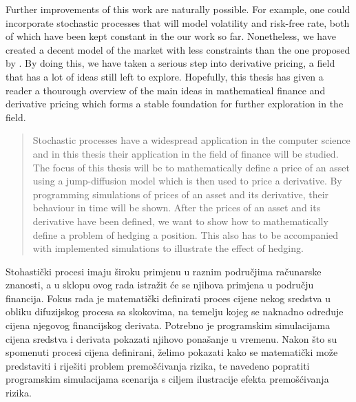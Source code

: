 \documentclass[times, utf8, diplomski]{fer}
\begin{document}
Further improvements of this work are naturally possible. For example, one could incorporate stochastic processes that will model volatility and risk-free rate, both of which have been kept constant in the our work so far. Nonetheless, we have created a decent model of the market with less constraints than the one proposed by \cite{black_pricing_1972}. By doing this, we have taken a serious step into derivative pricing, a field that has a lot of ideas still left to explore. Hopefully, this thesis has given a reader a thourough overview of the main ideas in mathematical finance and derivative pricing which forms a stable foundation for further exploration in the field. 



\nocite{*}

\listoffigures

\newpage
\begin{abstract}
Stochastic processes have a widespread application in the computer science and in this thesis their application in the field of finance will be studied. The focus of this thesis will be to mathematically define a price of an asset using a jump-diffusion model which is then used to price a derivative. By programming simulations of prices of an asset and its derivative, their behaviour in time will be shown. After the prices of an asset and its derivative have been defined, we want to show how to mathematically define a problem of hedging a position. This also has to be accompanied with implemented simulations to illustrate the effect of hedging.

\end{abstract}

\begin{sazetak}
Stohastički procesi imaju široku primjenu u raznim područjima računarske znanosti, a u sklopu ovog rada istražit će se njihova primjena u području financija. Fokus rada je matematički definirati proces cijene nekog sredstva u obliku difuzijskog procesa sa skokovima, na temelju kojeg se naknadno određuje cijena njegovog financijskog derivata. Potrebno je programskim simulacijama cijena sredstva i derivata pokazati njihovo ponašanje u vremenu. Nakon što su spomenuti procesi cijena definirani, želimo pokazati kako se matematički može predstaviti i riješiti problem premošćivanja rizika, te navedeno popratiti programskim simulacijama scenarija s ciljem ilustracije efekta premošćivanja rizika.

\end{sazetak}
\end{document}
